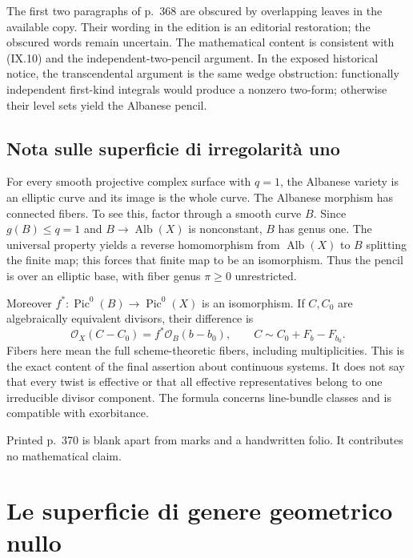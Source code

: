 The first two paragraphs of p.~368 are obscured by overlapping leaves in the available copy. Their wording in the edition is an editorial restoration; the obscured words remain uncertain. The mathematical content is consistent with (IX.10) and the independent-two-pencil argument. In the exposed historical notice, the transcendental argument is the same wedge obstruction: functionally independent first-kind integrals would produce a nonzero two-form; otherwise their level sets yield the Albanese pencil.

\section{Nota sulle superficie di irregolarità uno}\label{cp2-ix-12}

For every smooth projective complex surface with \(q=1\), the Albanese variety is an elliptic curve and its image is the whole curve. The Albanese morphism has connected fibers. To see this, factor through a smooth curve \(B\). Since \(g(B)\leq q=1\) and \(B\to\operatorname{Alb}(X)\) is nonconstant, \(B\) has genus one. The universal property yields a reverse homomorphism from \(\operatorname{Alb}(X)\) to \(B\) splitting the finite map; this forces that finite map to be an isomorphism. Thus the pencil is over an elliptic base, with fiber genus \(\pi\geq0\) unrestricted.

Moreover \(f^*:\operatorname{Pic}^0(B)\to\operatorname{Pic}^0(X)\) is an isomorphism. If \(C,C_0\) are algebraically equivalent divisors, their difference is
\begin{equation*}\label{cp2-ix-eq11}
\mathcal O_X(C-C_0)=f^*\mathcal O_B(b-b_0),
\qquad C\sim C_0+F_b-F_{b_0}.
\tag{IX.11}
\end{equation*}
Fibers here mean the full scheme-theoretic fibers, including multiplicities. This is the exact content of the final assertion about continuous systems. It does not say that every twist is effective or that all effective representatives belong to one irreducible divisor component. The formula concerns line-bundle classes and is compatible with exorbitance.

Printed p.~370 is blank apart from marks and a handwritten folio. It contributes no mathematical claim.

\chapter{Le superficie di genere geometrico nullo}
\label{cp2-x}


